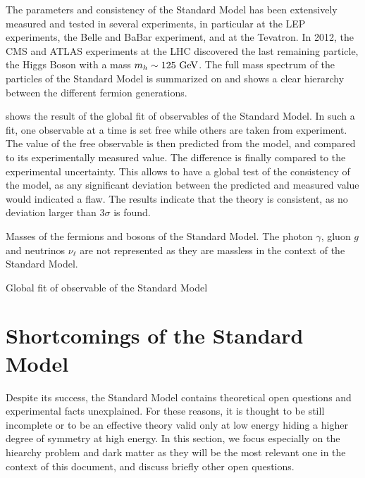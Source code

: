     The parameters and consistency of the Standard
    Model has been extensively measured and tested in several experiments, in particular
    at the LEP experiments, the Belle and BaBar experiment, and at the Tevatron. In 2012,
    the CMS and ATLAS experiments at the LHC discovered the last remaining particle, the
    Higgs Boson with a mass $m_{h} \sim 125~\text{GeV}$. The full mass spectrum of the particles
    of the Standard Model is summarized on  and
    shows a clear hierarchy between the different fermion generations.

     shows the result of the global fit of
    observables of the Standard Model. In such a fit, one observable at a time is set free
    while others are taken from experiment. The value of the free observable is then
    predicted from the model, and compared to its experimentally measured value. The
    difference is finally compared to the experimental uncertainty. This allows to have a
    global test of the consistency of the model, as any significant deviation between the
    predicted and measured value would indicated a flaw. The results indicate that the theory
    is consistent, as no deviation larger than 3$\sigma$ is found.

                 {Masses of the fermions and bosons of the Standard Model. The photon
                 $\gamma$, gluon $g$ and neutrinos $\nu_\ell$ are not represented as they
                 are massless in the context of the Standard Model.}

                  {Global fit of observable of the Standard Model}

    \section{Shortcomings of the Standard Model}

    Despite its success, the Standard Model contains theoretical open questions and
    experimental facts unexplained. For these reasons, it is thought to be still incomplete
    or to be an effective theory valid only at low energy hiding a higher
    degree of symmetry at high energy. In this section, we focus especially on the hiearchy
    problem and dark matter as they will be the most relevant one in the context of this
    document, and discuss briefly other open questions.

